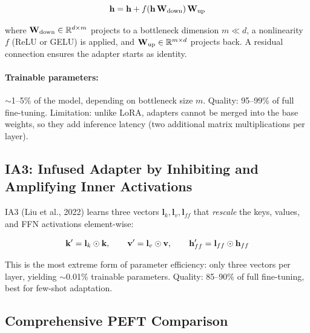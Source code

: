 \[
    \mathbf{h} = \mathbf{h} + f(\mathbf{h}\,\mathbf{W}_{\text{down}})\,\mathbf{W}_{\text{up}}
\]

where $\mathbf{W}_{\text{down}} \in \mathbb{R}^{d \times m}$ projects to a bottleneck
dimension $m \ll d$, a nonlinearity $f$ (ReLU or GELU) is applied, and
$\mathbf{W}_{\text{up}} \in \mathbb{R}^{m \times d}$ projects back.  A residual connection
ensures the adapter starts as identity.

\paragraph{Trainable parameters:} $\sim$1--5\% of the model, depending on
bottleneck size $m$.  Quality: 95--99\% of full fine-tuning.  Limitation:
unlike LoRA, adapters cannot be merged into the base weights, so they add
inference latency (two additional matrix multiplications per layer).

\subsection{IA3: Infused Adapter by Inhibiting and Amplifying Inner Activations}
\label{sec:ia3}

IA3 (Liu et al., 2022) learns three vectors $\mathbf{l}_k, \mathbf{l}_v,
\mathbf{l}_{ff}$ that \emph{rescale} the keys, values, and FFN activations
element-wise:

\[
    \mathbf{k}' = \mathbf{l}_k \odot \mathbf{k}, \qquad
    \mathbf{v}' = \mathbf{l}_v \odot \mathbf{v}, \qquad
    \mathbf{h}'_{ff} = \mathbf{l}_{ff} \odot \mathbf{h}_{ff}
\]

This is the most extreme form of parameter efficiency: only three vectors per
layer, yielding $\sim$0.01\% trainable parameters.  Quality: 85--90\% of full
fine-tuning, best for few-shot adaptation.

\subsection{Comprehensive PEFT Comparison}

